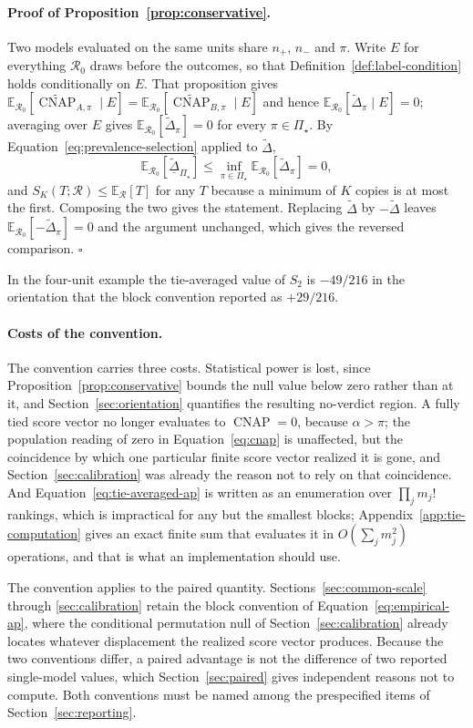 \documentclass[11pt]{article}
\newcommand{\CNAP}{\operatorname{CNAP}}
\newcommand{\Regime}{\mathcal{R}}
\newcommand{\PSet}{\Pi_\star}
\newcommand{\E}{\mathbb{E}}
\newcommand{\CNAPta}{\widetilde{\CNAP}}
\newcommand{\Dta}{\widetilde{\Delta}}
\newcommand{\RobDta}{\underline{\widetilde{\Delta}}_{\PSet}}
\theoremstyle{remark}
\begin{document}
\paragraph{Proof of Proposition~\ref{prop:conservative}.}
Two models evaluated on the same units share $n_+$, $n_-$ and $\pi$. Write $E$ for everything $\Regime_0$ draws before the outcomes, so that Definition~\ref{def:label-condition} holds conditionally on $E$. That proposition gives $\E_{\Regime_0}[\CNAPta_{A,\pi}\mid E]=\E_{\Regime_0}[\CNAPta_{B,\pi}\mid E]$ and hence $\E_{\Regime_0}[\Dta_\pi\mid E]=0$; averaging over $E$ gives $\E_{\Regime_0}[\Dta_\pi]=0$ for every $\pi\in\PSet$. By Equation~\eqref{eq:prevalence-selection} applied to $\Dta$,
\[
\E_{\Regime_0}[\RobDta]
\leq
\inf_{\pi\in\PSet}\E_{\Regime_0}[\Dta_\pi]
=0 ,
\]
and $S_K(T;\Regime)\leq\E_{\Regime}[T]$ for any $T$ because a minimum of $K$ copies is at most the first. Composing the two gives the statement. Replacing $\Dta$ by $-\Dta$ leaves $\E_{\Regime_0}[-\Dta_\pi]=0$ and the argument unchanged, which gives the reversed comparison. $\square$

In the four-unit example the tie-averaged value of $S_2$ is $-49/216$ in the orientation that the block convention reported as $+29/216$.

\paragraph{Costs of the convention.}
The convention carries three costs. Statistical power is lost, since Proposition~\ref{prop:conservative} bounds the null value below zero rather than at it, and Section~\ref{sec:orientation} quantifies the resulting no-verdict region. A fully tied score vector no longer evaluates to $\CNAP=0$, because $\alpha>\pi$; the population reading of zero in Equation~\eqref{eq:cnap} is unaffected, but the coincidence by which one particular finite score vector realized it is gone, and Section~\ref{sec:calibration} was already the reason not to rely on that coincidence. And Equation~\eqref{eq:tie-averaged-ap} is written as an enumeration over $\prod_j m_j!$ rankings, which is impractical for any but the smallest blocks; Appendix~\ref{app:tie-computation} gives an exact finite sum that evaluates it in $O(\sum_j m_j^2)$ operations, and that is what an implementation should use.

The convention applies to the paired quantity. Sections~\ref{sec:common-scale} through \ref{sec:calibration} retain the block convention of Equation~\eqref{eq:empirical-ap}, where the conditional permutation null of Section~\ref{sec:calibration} already locates whatever displacement the realized score vector produces. Because the two conventions differ, a paired advantage is not the difference of two reported single-model values, which Section~\ref{sec:paired} gives independent reasons not to compute. Both conventions must be named among the prespecified items of Section~\ref{sec:reporting}.
\end{document}
